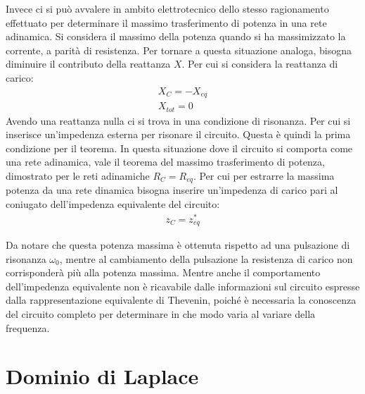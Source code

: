 \documentclass{article}
\numberwithin{equation}{subsection}
\begin{document}
Invece ci si può avvalere in ambito elettrotecnico dello stesso ragionamento effettuato per determinare il massimo trasferimento di potenza in una rete adinamica. Si 
considera il massimo della potenza quando si ha massimizzato la corrente, a parità di resistenza. Per tornare a questa situazione analoga, bisogna diminuire il contributo 
della reattanza $X$. Per cui si considera la reattanza di carico:
\begin{gather*}
    X_C=-X_{eq}\\
    X_{tot}=0
\end{gather*}
Avendo una reattanza nulla ci si trova in una condizione di risonanza. Per cui si inserisce un'impedenza esterna per risonare il circuito. Questa è quindi la prima 
condizione per il teorema. In questa situazione dove il circuito si comporta come una rete adinamica, vale il teorema del massimo trasferimento di potenza, dimostrato 
per le reti adinamiche $R_C=R_{eq}$. 
Per cui per estrarre la massima potenza da una rete dinamica bisogna inserire un'impedenza di carico pari al coniugato dell'impedenza equivalente del circuito:
\begin{gather*}
    z_C=z_{eq}^*
\end{gather*}

Da notare che questa potenza massima è ottenuta rispetto ad una pulsazione di risonanza $\omega_0$, mentre al cambiamento della pulsazione la resistenza di carico non corrisponderà 
più alla potenza massima. Mentre anche il comportamento dell'impedenza equivalente non è ricavabile dalle informazioni sul circuito espresse dalla rappresentazione equivalente 
di Thevenin, poiché è necessaria la conoscenza del circuito completo per determinare in che modo varia al variare della frequenza. 

\clearpage

\clearpage

\section{Dominio di Laplace}
\end{document}
